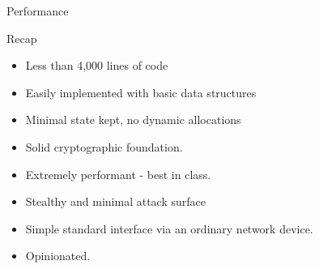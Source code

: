\documentclass[xcolor=table]{beamer}
\begin{document}
    \begin{frame}[fragile]{Performance}
        \begin{figure}
            \hspace*{-1cm} %
            \label{fig:example}%
        \end{figure}
    \end{frame}
    \begin{frame}{Recap}
        \begin{minipage}{0.48\textwidth}
            \begin{itemize}
                \item Less than 4,000 lines of code
                \item Easily implemented with basic data structures
                \item Minimal state kept, no dynamic allocations
                \item Solid cryptographic foundation.
            \end{itemize}
        \end{minipage}
        \begin{minipage}{0.5\textwidth}
            \begin{itemize}
                \item Extremely performant - best in class.
                \item Stealthy and minimal attack surface
                \item Simple standard interface via an ordinary network device.
                \item Opinionated.
            \end{itemize}
        \end{minipage}
    \end{frame}
\end{document}
